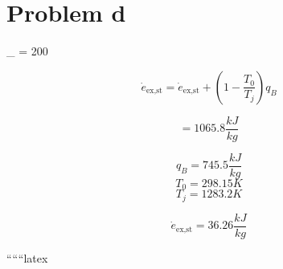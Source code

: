 \section*{Problem d}

 \quad {}_{} = 200 

\[
\dot{e}_{\text{ex,st}} = \dot{e}_{\text{ex,st}} + \left( 1 - \frac{T_0}{T_j} \right) q_B
\]

\[
= 1065.8 \frac{kJ}{kg}
\]

\[
q_B = 745.5 \frac{kJ}{kg}
\]
\[
T_0 = 298.15 K
\]
\[
T_j = 1283.2 K
\]

\[
\dot{e}_{\text{ex,st}} = 36.26 \frac{kJ}{kg}
\]

``````latex